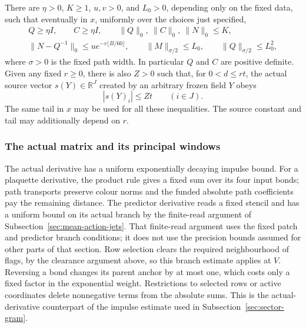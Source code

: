 \begin{proposition}
\label{prop:actual-global-row-prices}
There are $\eta>0$, $K\ge1$, $u,v>0$, and $L_0>0$, depending only
on the fixed data, such that eventually in $x$, uniformly over the
choices just specified,
\begin{gather}
 Q\ge\eta I,\qquad C\ge\eta I,\qquad
 \|Q\|_0,\ \|C\|_0,\ \|N\|_0\le K,
 \label{eq:global-row-kernels}\\
 \|N-Q^{-1}\|_0\le u e^{-v\lfloor B/60\rfloor},\qquad
 \|M\|_{\sigma/2}\le L_0,\qquad
 \|Q\|_{\sigma/2}\le L_0^2,
 \label{eq:global-row-error}
\end{gather}
where $\sigma>0$ is the fixed path width. In particular $Q$ and $C$
are positive definite. Given any fixed $r\ge0$, there is also $Z>0$
such that, for $0<d\le rt$, the actual source vector $s(Y)\in\mathbb R^J$
created by an arbitrary frozen field $Y$ obeys
\begin{equation}\label{eq:global-row-source}
                      |s(Y)_i|\le Zt\qquad(i\in J).
\end{equation}
The same tail in $x$ may be used for all these inequalities. The
source constant and tail may additionally depend on $r$.
\end{proposition}

\subsubsection{The actual matrix and its principal windows}

The actual derivative has a uniform exponentially decaying impulse
bound. For a plaquette derivative, the product rule gives a fixed sum
over its four input bonds; path transports preserve colour norms and
the funded absolute path coefficients pay the remaining distance. The
predictor derivative reads a fixed stencil and has a uniform bound on
its actual branch by the finite-read argument of
Subsection~\ref{sec:mean-action-jets}. That finite-read argument uses the
fixed patch and predictor branch conditions; it does not use the
precision bounds assumed for other parts of that section. Row selection
clears the required neighbourhood of flags, by the clearance argument
above, so this branch estimate applies at $V$.
Reversing a bond changes its parent anchor by at most one, which costs
only a fixed factor in the exponential weight. Restrictions to selected
rows or active coordinates delete nonnegative terms from the absolute
sums. This is the actual-derivative counterpart of the impulse estimate
used in Subsection~\ref{sec:sector-gram}.


